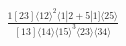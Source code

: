 \documentclass[varwidth, border=5pt]{standalone}
\begin{document}
\begin{my}
$\begin{gathered}
\scriptscriptstyle\frac{1[23]⟨12⟩^2⟨1|2+5|1]⟨25⟩}{[13]⟨14⟩⟨15⟩^3⟨23⟩⟨34⟩}
\end{gathered}$
\end{my}
\end{document}
